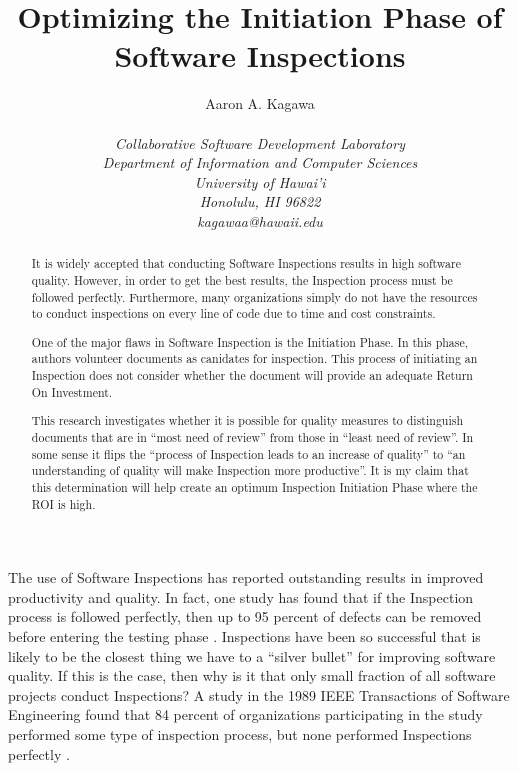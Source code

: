 \documentclass[11pt,twocolumn]{article}
\begin{document}
\title{Optimizing the Initiation Phase of Software Inspections}

\author{\protect\begin{tabular}{ccc}
Aaron A. Kagawa \\
\end{tabular}\\
\em  Collaborative Software Development Laboratory \\
\em  Department of Information and Computer Sciences \\
\em  University of Hawai'i \\
\em  Honolulu, HI 96822 \\
\em  kagawaa@hawaii.edu}
\maketitle
\thispagestyle{empty}

\begin{abstract}  %
It is widely accepted that conducting Software Inspections results in high
software quality. However, in order to get the best results, the
Inspection process must be followed perfectly. Furthermore, many
organizations simply do not have the resources to conduct inspections on
every line of code due to time and cost constraints.

One of the major flaws in Software Inspection is the Initiation Phase. In
this phase, authors volunteer documents as canidates for inspection.  This
process of initiating an Inspection does not consider whether the document
will provide an adequate Return On Investment.

This research investigates whether it is possible for quality measures to
distinguish documents that are in ``most need of review'' from those in
``least need of review''. In some sense it flips the ``process of
Inspection leads to an increase of quality'' to ``an understanding of
quality will make Inspection more productive''. It is my claim that this
determination will help create an optimum Inspection Initiation Phase where
the ROI is high.
\end{abstract}

\label{sec:intro}
The use of Software Inspections has reported outstanding results in
improved productivity and quality. In fact, one study has found that if the
Inspection process is followed perfectly, then up to 95 percent of defects
can be removed before entering the testing phase \cite{Bush90}.
Inspections have been so successful that is likely to be the closest thing
we have to a ``silver bullet'' for improving software quality.  If this is
the case, then why is it that only small fraction of all software projects
conduct Inspections?  A study in the 1989 IEEE Transactions of Software
Engineering found that 84 percent of organizations participating in the
study performed some type of inspection process, but none performed
Inspections perfectly \cite{Bisant89}.
\end{document}
